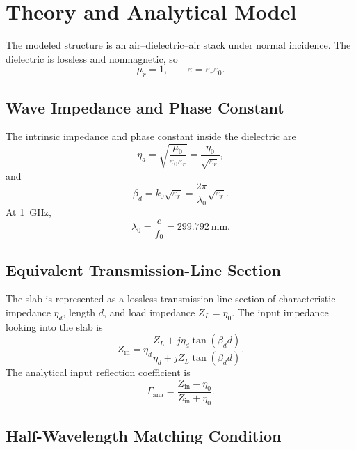 \section{Theory and Analytical Model}
\label{sec:theory-and-model}

The modeled structure is an air--dielectric--air stack under normal incidence. The
dielectric is lossless and nonmagnetic, so
\begin{equation}
\mu_r=1,
\qquad
\varepsilon=\varepsilon_r\varepsilon_0.
\end{equation}

\subsection{Wave Impedance and Phase Constant}

The intrinsic impedance and phase constant inside the dielectric are
\begin{equation}
\eta_d=\sqrt{\frac{\mu_0}{\varepsilon_0\varepsilon_r}}
=\frac{\eta_0}{\sqrt{\varepsilon_r}},
\label{eq:eta-d}
\end{equation}
and
\begin{equation}
\beta_d=k_0\sqrt{\varepsilon_r}
=\frac{2\pi}{\lambda_0}\sqrt{\varepsilon_r}.
\label{eq:beta-d}
\end{equation}
At 1~GHz,
\begin{equation}
\lambda_0=\frac{c}{f_0}=299.792~\text{mm}.
\label{eq:lambda0}
\end{equation}

\subsection{Equivalent Transmission-Line Section}

The slab is represented as a lossless transmission-line section of characteristic
impedance $\eta_d$, length $d$, and load impedance $Z_L=\eta_0$. The input impedance
looking into the slab is
\begin{equation}
Z_{\mathrm{in}}=\eta_d
\frac{Z_L+j\eta_d\tan(\beta_d d)}
{\eta_d+jZ_L\tan(\beta_d d)}.
\label{eq:zin}
\end{equation}
The analytical input reflection coefficient is
\begin{equation}
\Gamma_{\mathrm{ana}}=
\frac{Z_{\mathrm{in}}-\eta_0}{Z_{\mathrm{in}}+\eta_0}.
\label{eq:gamma}
\end{equation}

\subsection{Half-Wavelength Matching Condition}

